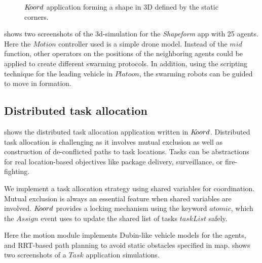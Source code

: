 \begin{figure}[ht!]
\begin{mdframed}
    \noindent
    \begin{center}
        \scriptsize
          {}
{}
    \end{center}
\end{mdframed}
    \caption{$K\kern-2pt oord$ application forming a shape in 3D defined by the static corners.}
    \label{fig:squareform}
\end{figure}

 shows two screenshots of the 3d-simulation for the \emph{Shapeform} app with 25 agents. Here the $\mathit{Motion}$ controller used is a simple drone model. Instead of the $\mathit{mid}$ function, other operators on the positions of the neighboring agents could be applied to create different swarming protocols. In addition, using the scripting technique for the leading vehicle in $\mathit{Platoon}$, the swarming robots can be guided to move in formation.


\subsection{Distributed task allocation}
\label{sec:task}
  shows the distributed task allocation application written in $K\kern-2pt oord$. Distributed task allocation is challenging as it involves mutual exclusion as well as construction of de-conflicted paths to task locations. Tasks can be abstractions for real location-based objectives like package delivery, surveillance, or fire-fighting. 

We implement a  task allocation strategy using shared variables for coordination. Mutual exclusion is always an essential feature when shared variables are involved. $K\kern-2pt oord$ provides a locking mechanism using the keyword $\mathit{atomic}$, which the $\mathit{Assign}$ event uses to update the shared list of tasks $\mathit{taskList}$ safely. 

Here the motion module implements Dubin-like vehicle models for the agents, and RRT-based path planning to avoid static obstacles specified in map.  shows two screenshots of a $\mathit{Task}$ application simulations. 

